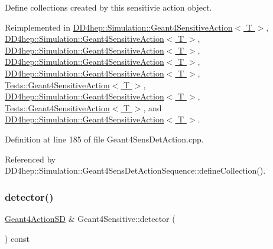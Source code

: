 Define collections created by this sensitivie action object. 



Reimplemented in \hyperlink{class_d_d4hep_1_1_simulation_1_1_geant4_sensitive_action_a103768b61e0f22768de9a91ce588a88c}{D\+D4hep\+::\+Simulation\+::\+Geant4\+Sensitive\+Action$<$ T $>$}, \hyperlink{class_d_d4hep_1_1_simulation_1_1_geant4_sensitive_action_a6faf8e3de0d88a7a7f2db664300718ad}{D\+D4hep\+::\+Simulation\+::\+Geant4\+Sensitive\+Action$<$ T $>$}, \hyperlink{class_d_d4hep_1_1_simulation_1_1_geant4_sensitive_action_af2a7d081e4173833bd77977cbc20ee0f}{D\+D4hep\+::\+Simulation\+::\+Geant4\+Sensitive\+Action$<$ T $>$}, \hyperlink{class_d_d4hep_1_1_simulation_1_1_geant4_sensitive_action_ac21d5f2e63b47e87de641e3920d245e8}{D\+D4hep\+::\+Simulation\+::\+Geant4\+Sensitive\+Action$<$ T $>$}, \hyperlink{class_d_d4hep_1_1_simulation_1_1_geant4_sensitive_action_abf6d5d9073398944a94a773e06df9594}{D\+D4hep\+::\+Simulation\+::\+Geant4\+Sensitive\+Action$<$ T $>$}, \hyperlink{class_tests_1_1_geant4_sensitive_action_ae9b3b49c444bf20e0611d8532cbd7d45}{Tests\+::\+Geant4\+Sensitive\+Action$<$ T $>$}, \hyperlink{class_d_d4hep_1_1_simulation_1_1_geant4_sensitive_action_a87ec394277c9edd3eb91233c96d67d5e}{D\+D4hep\+::\+Simulation\+::\+Geant4\+Sensitive\+Action$<$ T $>$}, \hyperlink{class_tests_1_1_geant4_sensitive_action_a0083f23f8b2160bc6e03ccd11077182c}{Tests\+::\+Geant4\+Sensitive\+Action$<$ T $>$}, and \hyperlink{class_d_d4hep_1_1_simulation_1_1_geant4_sensitive_action_a72dbf8f8489f717a74cf84c36c27b595}{D\+D4hep\+::\+Simulation\+::\+Geant4\+Sensitive\+Action$<$ T $>$}.



Definition at line 185 of file Geant4\+Sens\+Det\+Action.\+cpp.



Referenced by D\+D4hep\+::\+Simulation\+::\+Geant4\+Sens\+Det\+Action\+Sequence\+::define\+Collection().

\hypertarget{class_d_d4hep_1_1_simulation_1_1_geant4_sensitive_aec1bfe9ac838d359d9e3948118b5c42d}{}\label{class_d_d4hep_1_1_simulation_1_1_geant4_sensitive_aec1bfe9ac838d359d9e3948118b5c42d} 
\subsubsection{\texorpdfstring{detector()}{detector()}}
{\footnotesize\ttfamily \hyperlink{class_d_d4hep_1_1_simulation_1_1_geant4_action_s_d}{Geant4\+Action\+SD} \& Geant4\+Sensitive\+::detector (\begin{DoxyParamCaption}{ }\end{DoxyParamCaption}) const}



